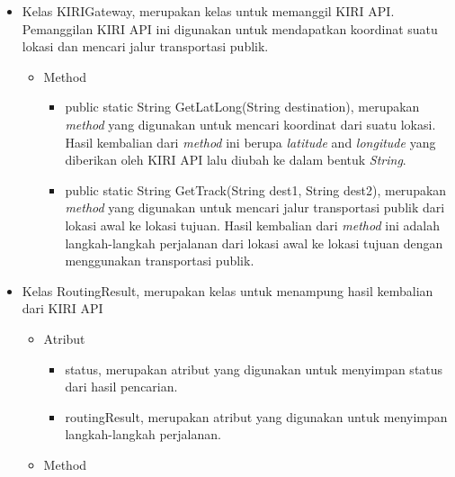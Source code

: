 \begin{itemize}
		\item Kelas KIRIGateway, merupakan kelas untuk memanggil KIRI API. Pemanggilan KIRI API ini digunakan untuk mendapatkan koordinat suatu lokasi dan mencari jalur transportasi publik.
		
		
				\begin{itemize}
							\item Method
							
							
									\begin{itemize}
												\item public static String GetLatLong(String destination), merupakan \textit{method} yang digunakan untuk mencari koordinat dari suatu lokasi. Hasil kembalian dari \textit{method} ini berupa \textit{latitude} and \textit{longitude} yang diberikan oleh KIRI API lalu diubah ke dalam bentuk \textit{String}.
												\item public static String GetTrack(String dest1, String dest2), merupakan \textit{method} yang digunakan untuk mencari jalur transportasi publik dari lokasi awal ke lokasi tujuan. Hasil kembalian dari \textit{method} ini adalah langkah-langkah perjalanan dari lokasi awal ke lokasi tujuan dengan menggunakan transportasi publik.
									\end{itemize}
				\end{itemize}
		
		
		\item Kelas RoutingResult, merupakan kelas untuk menampung hasil kembalian dari KIRI API
		
		
				\begin{itemize}
							\item Atribut
					
					
									\begin{itemize}
												\item status, merupakan atribut yang digunakan untuk menyimpan status dari hasil pencarian.
												\item routingResult, merupakan atribut yang digunakan untuk menyimpan langkah-langkah perjalanan.
									\end{itemize}
					
							\item Method
					

\end{itemize}
\end{itemize}
